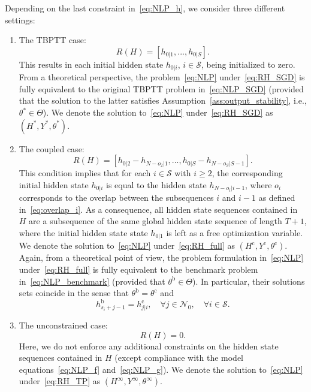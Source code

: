 \documentclass{article} %
\begin{document}
Depending on the last constraint in~\eqref{eq:NLP_h}, we consider three different settings:
\begin{enumerate}
	\item The TBPTT case:
	\begin{equation}\label{eq:RH_SGD}
		R(H) = [h_{0|1},...,h_{0|S}].
	\end{equation}
	This results in each initial hidden state $h_{0|i}$, $i\in\mathcal{S}$, being initialized to zero. From a theoretical perspective, the problem~\eqref{eq:NLP} under~\eqref{eq:RH_SGD} is fully equivalent to the original TBPTT problem in~\eqref{eq:NLP_SGD} (provided that the solution to the latter satisfies Assumption~\ref{ass:output_stability}, i.e., $\theta^*\in\Theta$). We denote the solution to~\eqref{eq:NLP} under~\eqref{eq:RH_SGD} as $(H^*,Y^*,\theta^*)$.
	
	\item The coupled case:
	\begin{equation}\label{eq:RH_full}
		R(H) = [h_{0|2} - h_{N-o_2|1},...,h_{0|S}-h_{N-o_S|S-1}].
	\end{equation}
	This condition implies that for each $i\in\mathcal{S}$ with $i\geq2$, the corresponding initial hidden state $h_{0|i}$ is equal to the hidden state $h_{N-o_i|i-1}$, where $o_i$ corresponds to the overlap between the subsequences $i$ and $i-1$ as defined in~\eqref{eq:overlap_i}.
	As a consequence, all hidden state sequences contained in $H$ are a subsequence of the same global hidden state sequence of length $T+1$, where the initial hidden state state $h_{0|1}$ is left as a free optimization variable.
	We denote the solution to~\eqref{eq:NLP} under~\eqref{eq:RH_full} as $(H^\mathrm{c},Y^\mathrm{c},\theta^\mathrm{c})$.
	Again, from a theoretical point of view, the problem formulation in~\eqref{eq:NLP} under~\eqref{eq:RH_full} is fully equivalent to the benchmark problem in~\eqref{eq:NLP_benchmark} (provided that $\theta^\mathrm{b}\in\Theta$). In particular, their solutions sets coincide in the sense that $\theta^\mathrm{b} = \theta^\mathrm{c}$ and
	\begin{equation}\label{eq:equivalence}
		h^\mathrm{b}_{s_i+j-1} = h^\mathrm{c}_{j|i},\quad \forall j\in\mathcal{N}_0,\quad \forall i\in\mathcal{S}.
	\end{equation}
	
	\item The unconstrained case:
	\begin{equation}\label{eq:RH_TP}
		R(H)=0.
	\end{equation}
	Here, we do not enforce any additional constraints on the hidden state sequences contained in $H$ (except compliance with the model equations~\eqref{eq:NLP_f} and~\eqref{eq:NLP_g}).
 	We denote the solution to~\eqref{eq:NLP} under~\eqref{eq:RH_TP} as $(H^\infty,Y^\infty,\theta^\infty)$.
\end{enumerate}
\end{document}
